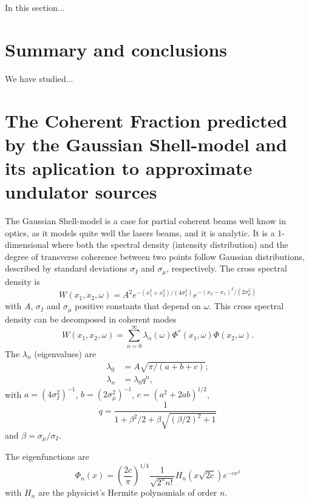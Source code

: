 \documentclass{iucr}              %
\begin{document}
In this section...


\section{Summary and conclusions}
\label{sec:summary}

We have studied...


\appendix

\section{The Coherent Fraction predicted by the Gaussian Shell-model and its aplication to approximate undulator sources}
\label{appendix:matchCF}
The Gaussian Shell-model is a case for partial coherent beams well know in optics, as it models quite well the lasers beams, and it is analytic. It is a 1-dimensional where both the spectral density (intensity distribution) and the degree of transverse coherence between two points follow Gaussian distributions, described by standard deviations $\sigma_I$ and $\sigma_{\mu}$, respectively. The cross spectral density is
\begin{equation}
W(x_1,x_2,\omega) = A^2 e^{-(x_1^2+x_2^2)/(4 \sigma_I^2)} e^{-(x_2-x_1)^2/(2 \sigma_{\mu}^2)}
\label{GS_CSD}
\end{equation}
with $A$, $\sigma_I$ and $\sigma_{\mu}$ positive constants that depend on $\omega$.
This cross spectral density can be decomposed in coherent modes
\cite{Starikov82,mandel_wolf} 
\begin{equation}
W(x_1,x_2,\omega) = \sum_{n=0}^{\infty} \lambda_n(\omega) \Phi^*(x_1,\omega) \Phi(x_2,\omega). 
\label{CMD}
\end{equation}
The $\lambda_n$ (eigenvalues) are
\begin{align}
\lambda_0 &= A \sqrt{\pi/( a+b+c)}; \\ 
\lambda_n &= \lambda_0 q ^n,
\end{align}
with $a = (4 \sigma_I^2)^{-1}$, $ 
b = (2 \sigma_{\mu}^2)^{-1}$, $ 
c = (a^2 + 2 a b)^{1/2}$,
\begin{equation}
q = \frac{1}{1 + \beta^2/2 + \beta\sqrt{(\beta/2)^2+1}} 
\label{q}
\end{equation}
and $\beta=\sigma_{\mu}/\sigma_I$. 

The eigenfunctions are
\begin{equation}
\Phi_n(x) = \left( \frac{2c}{\pi} \right)^{1/4} \frac{1}{\sqrt{2^n n!}} H_n(x\sqrt{2c})e^{-cx^2}
\label{GSeigenvalues}
\end{equation}
with $H_n$ are the physicist's Hermite polynomials of order $n$. 
\end{document}
